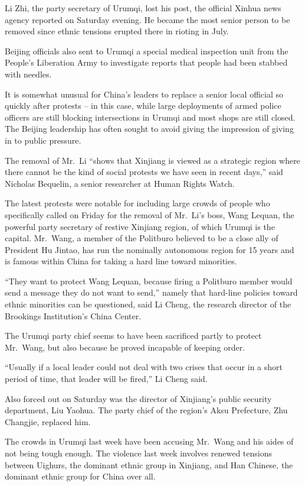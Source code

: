 ﻿\documentclass[12pt]{article}
\begin{document}
Li Zhi, the party secretary of Urumqi, lost his post, the official Xinhua news agency reported on
Saturday evening. He became the most senior person to be removed since ethnic tensions erupted there
in rioting in July.

Beijing officials also sent to Urumqi a special medical inspection unit from the People's Liberation
Army to investigate reports that people had been stabbed with needles.

It is somewhat unusual for China's leaders to replace a senior local official so quickly after
protests -- in this case, while large deployments of armed police officers are still blocking
intersections in Urumqi and most shops are still closed. The Beijing leadership has often sought to
avoid giving the impression of giving in to public pressure.

The removal of Mr.~Li ``shows that Xinjiang is viewed as a strategic region where there cannot be
the kind of social protests we have seen in recent days,'' said Nicholas Bequelin, a senior
researcher at Human Rights Watch.

The latest protests were notable for including large crowds of people who specifically called on
Friday for the removal of Mr.~Li's boss, Wang Lequan, the powerful party secretary of restive
Xinjiang region, of which Urumqi is the capital. Mr.~Wang, a member of the Politburo believed to be
a close ally of President Hu Jintao, has run the nominally autonomous region for 15 years and is
famous within China for taking a hard line toward minorities.

``They want to protect Wang Lequan, because firing a Politburo member would send a message they do
not want to send,'' namely that hard-line policies toward ethnic minorities can be questioned, said
Li Cheng, the research director of the Brookings Institution's China Center.

The Urumqi party chief seems to have been sacrificed partly to protect Mr.~Wang, but also because he
proved incapable of keeping order.

``Usually if a local leader could not deal with two crises that occur in a short period of time,
that leader will be fired,'' Li Cheng said.

Also forced out on Saturday was the director of Xinjiang's public security department, Liu Yaohua.
The party chief of the region's Aksu Prefecture, Zhu Changjie, replaced him.

The crowds in Urumqi last week have been accusing Mr.~Wang and his aides of not being tough enough.
The violence last week involves renewed tensions between Uighurs, the dominant ethnic group in
Xinjiang, and Han Chinese, the dominant ethnic group for China over all.
\end{document}
